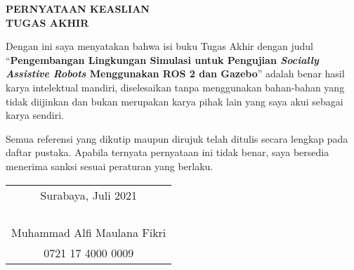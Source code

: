 \begin{center}
  \large
  \textbf{PERNYATAAN KEASLIAN\\TUGAS AKHIR}
\end{center}

\thispagestyle{empty}
\vspace{2ex}

Dengan ini saya menyatakan bahwa isi buku Tugas Akhir dengan judul
``\textbf{Pengembangan Lingkungan Simulasi untuk Pengujian \emph{Socially Assistive Robots} Menggunakan ROS 2 dan Gazebo}''
adalah benar hasil karya intelektual mandiri, diselesaikan tanpa menggunakan bahan-bahan yang tidak diijinkan dan bukan merupakan karya pihak lain yang saya akui sebagai karya sendiri.

Semua referensi yang dikutip maupun dirujuk telah ditulis secara lengkap pada daftar pustaka.
Apabila ternyata pernyataan ini tidak benar, saya bersedia menerima sanksi sesuai peraturan yang berlaku.

\vspace{4ex}

\begin{flushright}
  \begin{tabular}[b]{c}
    Surabaya, Juli 2021\\
    \\
    \\
    \\
    \\
    Muhammad Alfi Maulana Fikri\\
    0721 17 4000 0009
  \end{tabular}
\end{flushright}
